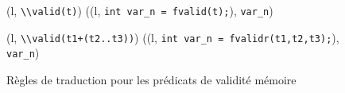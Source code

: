 \begin{figure*}[h!]
  \scriptsize{
    {
      {}
      {(l, \mbox{\lstinline'\\valid(t)'}) 
        ((l, \mbox{\lstinline'int var_n = fvalid(t);'}),
        \mbox{\lstinline'var_n'})
      }{}
    }

    {
      {}
      {
        (l, \mbox{\lstinline'\\valid(t1+(t2..t3))'}) 
        ((l, \mbox{\lstinline'int var_n = fvalidr(t1,t2,t3);'}),
        \mbox{\lstinline'var_n'})
      }{}
    }
  }
  \caption{Règles de traduction pour les prédicats de validité mémoire}
  \label{fig:valid}
\end{figure*}
